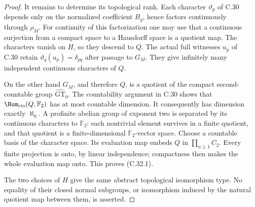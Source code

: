 \begin{proof}
It remains to determine its topological rank. Each character
$\vartheta_p$ of C.30 depends only on the normalized coefficient
$B_g$, hence factors continuously through $\rho_M$.
For continuity of this factorization one may use that a
continuous surjection from a compact space to a Hausdorff space
is a quotient map. The characters vanish on $H$, so they descend
to $Q$. The actual full witnesses $u_p$ of C.30 retain
$\vartheta_q(u_p)=\delta_{pq}$ after passage to $G_M$.
They give infinitely many independent continuous characters
of $Q$.

On the other hand $G_M$, and therefore $Q$, is a quotient of
the compact second-countable group
$\widehat{\mathrm{GT}}_0$. The countability argument in C.30
shows that $\Hom_{\mathrm{cts}}(Q,\mathbb F_2)$ has at most
countable dimension. It consequently has dimension exactly
$\aleph_0$. A profinite abelian group of exponent two is
separated by its continuous characters to $\mathbb F_2$:
each nontrivial element survives in a finite quotient, and
that quotient is a finite-dimensional $\mathbb F_2$-vector
space. Choose a countable basis of the character space.
Its evaluation map embeds $Q$ in $\prod_{n\geq1}C_2$.
Every finite projection is onto, by linear independence;
compactness then makes the whole evaluation map onto.
This proves (C.32.1).

The two choices of $H$ give the same abstract topological
isomorphism type. No equality of their closed normal subgroups,
or isomorphism induced by the natural quotient map between
them, is asserted.
\end{proof}


